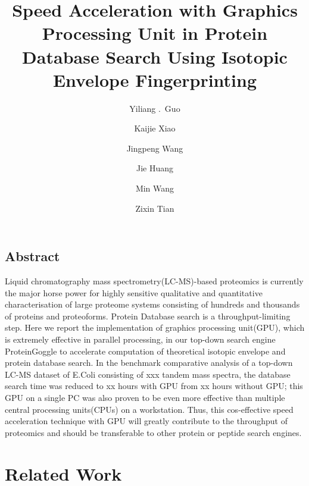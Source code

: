\documentclass[letterpaper,twocolumn,10pt]{article}
\begin{document}
\date{}

\title{\Large \bf Speed Acceleration with Graphics Processing Unit in Protein Database Search Using Isotopic Envelope Fingerprinting}

\author{
{\rm Yiliang  .\ Guo}\\
\and
{\rm Kaijie Xiao}\\
\and
{\rm Jingpeng Wang}\\
\and
{\rm Jie Huang}\\
\and
{\rm Min Wang}\\
\and
{\rm Zixin Tian}\\
}

\maketitle

\thispagestyle{empty}


\subsection*{Abstract}
Liquid chromatography mass spectrometry(LC-MS)-based proteomics is currently the major horse power for highly sensitive qualitative and quantitative characterisation of large proteome systems consisting of hundreds and thousands of proteins and proteoforms.  Protein Database search is a throughput-limiting step. Here we report the implementation of graphics processing unit(GPU), which is extremely effective in parallel processing, in our top-down search engine ProteinGoggle to accelerate computation of theoretical isotopic envelope and protein database search. In the benchmark comparative analysis of a top-down LC-MS dataset of E.Coli consisting of xxx tandem mass spectra, the database search time was reduced to xx hours with GPU from xx hours without GPU; this GPU on a single PC was also proven to be even more effective than multiple central processing units(CPUs) on a workstation. Thus, this cos-effective speed acceleration technique with GPU will greatly contribute to the throughput of proteomics and should be transferable to other protein or peptide search engines.

\section{Related Work }
\end{document}
